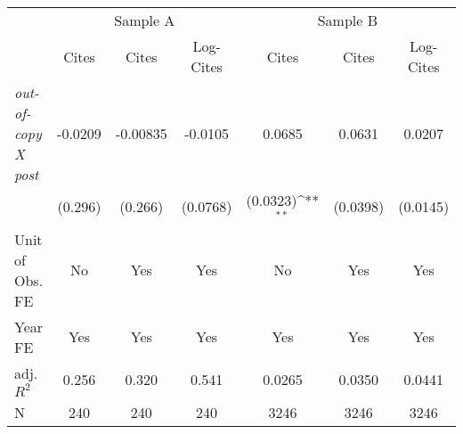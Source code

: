 {
\def\sym#1{\ifmmode^{#1}\else\(^{#1}\)\fi}
\begin{tabular*}{\hsize}{@{\hskip\tabcolsep\extracolsep\fill}l*{6}{c}}
\toprule
            &\multicolumn{3}{c}{Sample A}                                     &\multicolumn{3}{c}{Sample B}                                     \\\cmidrule(lr){2-4}\cmidrule(lr){5-7}
            &\multicolumn{1}{c}{Cites}&\multicolumn{1}{c}{Cites}&\multicolumn{1}{c}{Log-Cites}&\multicolumn{1}{c}{Cites}&\multicolumn{1}{c}{Cites}&\multicolumn{1}{c}{Log-Cites}\\
\midrule
\emph{out-of-copy X post}&     -0.0209         &    -0.00835         &     -0.0105         &      0.0685         &      0.0631         &      0.0207         \\
            &     (0.296)         &     (0.266)         &    (0.0768)         &    (0.0323)\sym{**} &    (0.0398)         &    (0.0145)         \\
\midrule
Unit of Obs. FE&          No         &         Yes         &         Yes         &          No         &         Yes         &         Yes         \\
Year FE     &         Yes         &         Yes         &         Yes         &         Yes         &         Yes         &         Yes         \\
adj. $R^2$  &       0.256         &       0.320         &       0.541         &      0.0265         &      0.0350         &      0.0441         \\
N           &         240         &         240         &         240         &        3246         &        3246         &        3246         \\
\bottomrule
\end{tabular*}
}

